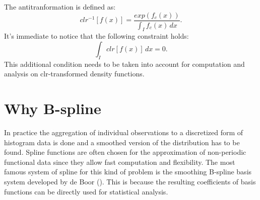 The antitranformation is defined as: 
\[  clr^{-1}[f(x)]= \frac{exp(f_c(x))}{\int_{I} f_c(x)\, dx}. 	\]
It's immediate to notice that the following constraint holds:
\[	\int_{I} clr[f(x)]\, dx = 0. 			\]
This additional condition needs to be taken into account for computation and analysis on clr-transformed density functions.


\section{Why B-spline}
In practice the aggregation of individual observations to a discretized form of histogram data is done and a smoothed version of the distribution has to be found.
Spline functions are often chosen for the approximation of non-periodic functional data since they allow fast computation and flexibility. The most famous system of spline for this kind of problem is the smoothing B-spline basis system developed by de Boor (\cite{ramsay:FDA}). This is because the resulting coefficients of basis functions can be directly used for statistical analysis. %

